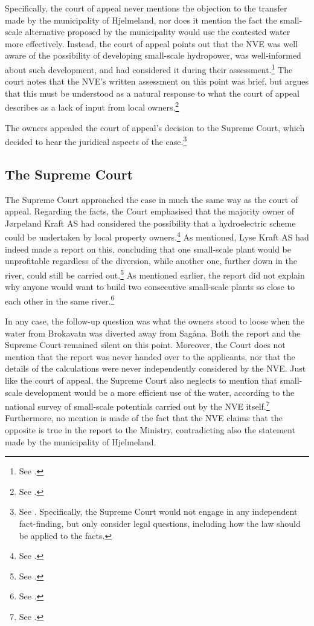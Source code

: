 Specifically, the court of appeal never mentions the objection to the transfer made by the municipality of Hjelmeland, nor does it mention the fact the small-scale alternative proposed by the municipality would use the contested water more effectively. Instead, the court of appeal points out that the NVE was well aware of the possibility of developing small-scale hydropower, was well-informed about such development, and had considered it during their assessment.\footnote{See \cite[9]{jorpeland11a}.} The court notes that the NVE's written assessment on this point was brief, but argues that this must be understood as a natural response to what the court of appeal describes as a lack of input from local owners.\footnote{See \cite[9]{jorpeland11a}.}

The owners appealed the court of appeal's decision to the Supreme Court, which decided to hear the  juridical aspects of the case.\footnote{See \cite[8]{jorpeland11}. Specifically, the Supreme Court would not engage in any independent fact-finding, but only consider legal questions, including how the law should be applied to the facts.}

\subsection{The Supreme Court}\label{sec:5:6:4}

The Supreme Court approached the case in much the same way as the court of appeal. Regarding the facts, the Court emphasised that the majority owner of Jørpeland Kraft AS had considered the possibility that a hydroelectric scheme could be undertaken by local property owners.\footnote{See \cite[53]{jorpeland11}.} As mentioned, Lyse Kraft AS had indeed made a report on this, concluding that one small-scale plant would be unprofitable regardless of the diversion, while another one, further down in the river, could still be carried out.\footnote{See \cite[23]{jorpeland09}.} As mentioned earlier, the report did not explain why anyone would want to build two consecutive small-scale plants so close to each other in the same river.\footnote{See \cite[16|23]{jorpeland09}.}

In any case, the follow-up question was what the owners stood to loose when the water from Brokavatn was diverted away from Sagåna. Both the report and the Supreme Court remained silent on this point. Moreover, the Court does not mention that the report was never handed over to the applicants, nor that the details of the calculations were never independently considered by the NVE. Just like the court of appeal, the Supreme Court also neglects to mention that small-scale development would be a more efficient use of the water, according to the national survey of small-scale potentials carried out by the NVE itself.\footnote{See \cite[16]{jorpeland09}.} Furthermore, no mention is made of the fact that the NVE claims that the opposite is true in the report to the Ministry, contradicting also the statement made by the municipality of Hjelmeland.

